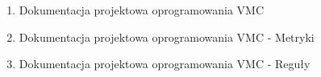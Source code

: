\begin{enumerate}
    \item Dokumentacja projektowa oprogramowania VMC
    \item Dokumentacja projektowa oprogramowania VMC - Metryki
    \item Dokumentacja projektowa oprogramowania VMC - Reguły
\end{enumerate}
